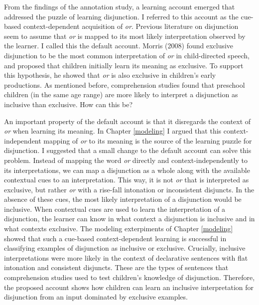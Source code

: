 \documentclass[oneside]{report}
\theoremstyle{definition}
\theoremstyle{definition}
\theoremstyle{definition}
\theoremstyle{remark}
\begin{document}
From the findings of the annotation study, a learning account emerged
that addressed the puzzle of learning disjunction. I referred to this
account as the cue-based context-dependent acquisition of \emph{or}.
Previous literature on disjunction seem to assume that \emph{or} is
mapped to its most likely interpretation observed by the learner. I
called this the default account. Morris (2008) found exclusive
disjunction to be the most common interpretation of \emph{or} in
child-directed speech, and proposed that children initially learn its
meaning as exclusive. To support this hypothesis, he showed that
\emph{or} is also exclusive in children's early productions. As
mentioned before, comprehension studies found that preschool children
(in the same age range) are more likely to interpret a disjunction as
inclusive than exclusive. How can this be?

An important property of the default account is that it disregards the
context of \emph{or} when learning its meaning. In Chapter
\ref{modeling} I argued that this context-independent mapping of
\emph{or} to its meaning is the source of the learning puzzle for
disjunction. I suggested that a small change to the default account can
solve this problem. Instead of mapping the word \emph{or} directly and
context-independently to its interpretations, we can map a disjunction
as a whole along with the available contextual cues to an
interpretation. This way, it is not \emph{or} that is interpreted as
exclusive, but rather \emph{or} with a rise-fall intonation or
inconsistent disjuncts. In the absence of these cues, the most likely
interpretation of a disjunction would be inclusive. When contextual cues
are used to learn the interpretation of a disjunction, the learner can
know in what context a disjunction is inclusive and in what contexts
exclusive. The modeling exterpiments of Chapter \ref{modeling} showed
that such a cue-based context-dependent learning is successful in
classifying examples of disjunction as inclusive or exclusive.
Crucially, inclusive interpretations were more likely in the context of
declarative sentences with flat intonation and consistent disjuncts.
These are the types of sentences that comprehension studies used to test
children's knowledge of disjunction. Therefore, the proposed account
shows how children can learn an inclusive interpretation for disjunction
from an input dominated by exclusive examples.
\end{document}
